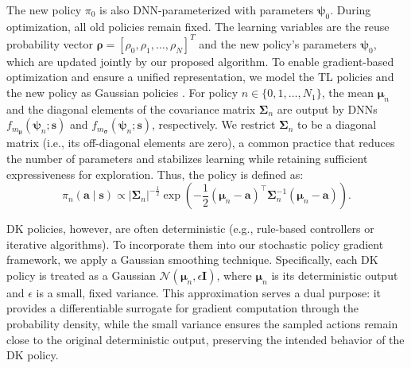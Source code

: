 \documentclass{IEEEtran}
\begin{document}
The new policy $\pi_{0}$ is also DNN-parameterized with parameters $\boldsymbol{\psi}_{0}$. During optimization, all old policies remain fixed. The learning variables are the reuse probability vector $\boldsymbol{\rho}=[\rho_{0},\rho_{1},\dots,\rho_{N}]^{T}$ and the new policy's parameters $\boldsymbol{\psi}_{0}$, which are updated jointly by our proposed algorithm. To enable gradient-based optimization and ensure a unified representation, we model the TL policies and the new policy as Gaussian policies \cite{Gaussianpolicy}. For policy $n\in\{0,1,\ldots,N_{1}\}$, the mean $\boldsymbol{\mu}_{n}$ and the diagonal elements of the covariance matrix $\boldsymbol{\Sigma}_{n}$ are output by DNNs $f_{m_{\boldsymbol{\mu}}}(\boldsymbol{\psi}_{n};\boldsymbol{s})$ and $f_{m_{\boldsymbol{\sigma}}}(\boldsymbol{\psi}_{n};\boldsymbol{s})$, respectively. We restrict $\boldsymbol{\Sigma}_{n}$ to be a diagonal matrix (i.e., its off-diagonal elements are zero), a common practice that reduces the number of parameters and stabilizes learning while retaining sufficient expressiveness for exploration. Thus, the policy is defined as:
\[
\pi_{n}(\boldsymbol{a}\mid\boldsymbol{s})\propto|\boldsymbol{\Sigma}_{n}|^{-\frac{1}{2}}\exp\left(-\frac{1}{2}(\boldsymbol{\mu}_{n}-\boldsymbol{a})^{\intercal}\boldsymbol{\Sigma}_{n}^{-1}(\boldsymbol{\mu}_{n}-\boldsymbol{a})\right).
\]

DK policies, however, are often deterministic (e.g., rule-based controllers or iterative algorithms). To incorporate them into our stochastic policy gradient framework, we apply a Gaussian smoothing technique. Specifically, each DK policy is treated as a Gaussian $\mathcal{N}(\boldsymbol{\mu}_{n},\epsilon\mathbf{I})$, where $\boldsymbol{\mu}_{n}$ is its deterministic output and $\epsilon$ is a small, fixed variance. This approximation serves a dual purpose: it provides a differentiable surrogate for gradient computation through the probability density, while the small variance ensures the sampled actions remain close to the original deterministic output, preserving the intended behavior of the DK policy.
\end{document}
